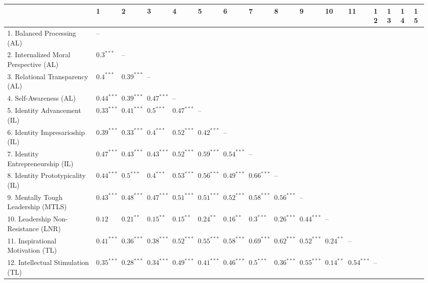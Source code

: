 \begin{table}[ht]
\centering
\begin{tabular}{llllllllllllllll}
  \hline
 & 1 & 2 & 3 & 4 & 5 & 6 & 7 & 8 & 9 & 10 & 11 & 12 & 13 & 14 & 15 \\ 
  \hline
1. Balanced Processing (AL) & -- &  &  &  &  &  &  &  &  &  &  &  &  &  &  \\ 
  2. Internalized Moral Perspective (AL) & $0.3^{***}$ & -- &  &  &  &  &  &  &  &  &  &  &  &  &  \\ 
  3. Relational Transparency (AL) & $0.4^{***}$ & $0.39^{***}$ & -- &  &  &  &  &  &  &  &  &  &  &  &  \\ 
  4. Self-Awareness (AL) & $0.44^{***}$ & $0.39^{***}$ & $0.47^{***}$ & -- &  &  &  &  &  &  &  &  &  &  &  \\ 
  5. Identity Advancement (IL) & $0.33^{***}$ & $0.41^{***}$ & $0.5^{***}$ & $0.47^{***}$ & -- &  &  &  &  &  &  &  &  &  &  \\ 
  6. Identity Impresarioship (IL) & $0.39^{***}$ & $0.33^{***}$ & $0.4^{***}$ & $0.52^{***}$ & $0.42^{***}$ & -- &  &  &  &  &  &  &  &  &  \\ 
  7. Identity Entrepreneurship (IL) & $0.47^{***}$ & $0.43^{***}$ & $0.43^{***}$ & $0.52^{***}$ & $0.59^{***}$ & $0.54^{***}$ & -- &  &  &  &  &  &  &  &  \\ 
  8. Identity Prototypicality (IL) & $0.44^{***}$ & $0.5^{***}$ & $0.4^{***}$ & $0.53^{***}$ & $0.56^{***}$ & $0.49^{***}$ & $0.66^{***}$ & -- &  &  &  &  &  &  &  \\ 
  9. Mentally Tough Leadership (MTLS) & $0.43^{***}$ & $0.48^{***}$ & $0.47^{***}$ & $0.51^{***}$ & $0.51^{***}$ & $0.52^{***}$ & $0.58^{***}$ & $0.56^{***}$ & -- &  &  &  &  &  &  \\ 
  10. Leadership Non-Resistance (LNR) & $0.12$ & $0.21^{**}$ & $0.15^{**}$ & $0.15^{**}$ & $0.24^{**}$ & $0.16^{**}$ & $0.3^{***}$ & $0.26^{***}$ & $0.44^{***}$ & -- &  &  &  &  &  \\ 
  11. Inspirational Motivation (TL) & $0.41^{***}$ & $0.36^{***}$ & $0.38^{***}$ & $0.52^{***}$ & $0.55^{***}$ & $0.58^{***}$ & $0.69^{***}$ & $0.62^{***}$ & $0.52^{***}$ & $0.24^{**}$ & -- &  &  &  &  \\ 
  12. Intellectual Stimulation (TL) & $0.35^{***}$ & $0.28^{***}$ & $0.34^{***}$ & $0.49^{***}$ & $0.41^{***}$ & $0.46^{***}$ & $0.5^{***}$ & $0.36^{***}$ & $0.55^{***}$ & $0.14^{**}$ & $0.54^{***}$ & -- &  &  &  \\ 

\end{tabular}
\end{table}
